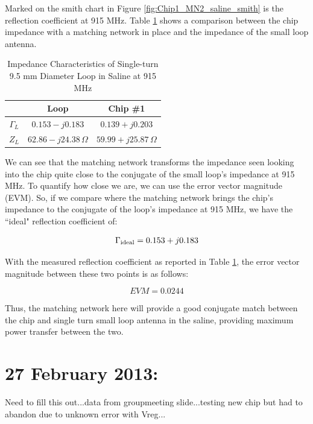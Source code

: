 \documentclass[12pt,onecolumn,titlepage]{article}
\begin{document}
Marked on the smith chart in Figure \ref{fig:Chip1_MN2_saline_smith} is the reflection coefficient at 915 MHz. Table \ref{tab:chip1_loop_saline_comparison} shows a comparison between the chip impedance with a matching network in place and the impedance of the small loop antenna.


\begin{table}[h]
\centering
	\caption{Impedance Characteristics of Single-turn 9.5 mm Diameter Loop in Saline at 915 MHz}
	\begin{tabular}{| c || c | c |}
	\hline
	& Loop & Chip \#1 \\ \hline
	$\Gamma_L$ & $0.153-j0.183$ & $0.139+j0.203$ \\ \hline
	$Z_L$ & $62.86-j24.38 \, \Omega$ & $59.99+j25.87 \, \Omega$ \\ \hline
	\end{tabular}
\label{tab:chip1_loop_saline_comparison}
\end{table}


We can see that the matching network transforms the impedance seen looking into the chip quite close to the conjugate of the small loop's impedance at 915 MHz. To quantify how close we are, we can use the error vector magnitude (EVM). So, if we compare where the matching network brings the chip's impedance to the conjugate of the loop's impedance at 915 MHz, we have the ``ideal" reflection coefficient of:

\[ \Gamma_{{\rm{ideal}}} = 0.153 + j0.183 \]

With the measured reflection coefficient as reported in Table \ref{tab:chip1_loop_saline_comparison}, the error vector magnitude between these two points is as follows:

\[ EVM = 0.0244 \]

Thus, the matching network here will provide a good conjugate match between the chip and single turn small loop antenna in the saline, providing maximum power transfer between the two.


\clearpage
\section{27 February 2013:}

\indent \indent Need to fill this out...data from groupmeeting slide...testing new chip but had to abandon due to unknown error with Vreg...
\end{document}
